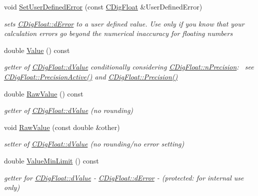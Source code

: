 \begin{DoxyCompactItemize}
void \hyperlink{classCDigFloat_a63f2632e5a762f37aa6eda4510c57502}{Set\+User\+Defined\+Error} (const \hyperlink{classCDigFloat}{C\+Dig\+Float} \&User\+Defined\+Error)
\begin{DoxyCompactList}\small\item\em sets \hyperlink{classCDigFloat_a25eb3782d1e727ff007a48f8308e3d4d}{C\+Dig\+Float\+::d\+Error} to a user defined value. Use only if you know that your calculation errors go beyond the numerical inaccuracy for floating numbers \end{DoxyCompactList}\item 
double \hyperlink{classCDigFloat_a51f185eb4ff3b24910c996739b6d5e9c}{Value} () const
\begin{DoxyCompactList}\small\item\em getter of \hyperlink{classCDigFloat_a4bbe69e30dd4e20527362493aa9aaf96}{C\+Dig\+Float\+::d\+Value} conditionally considering \hyperlink{classCDigFloat_ad580654be35246d14c91482581c0bc11}{C\+Dig\+Float\+::n\+Precision}\+:~\newline
 see \hyperlink{classCDigFloat_ad1f2365630c9e35e77c01093e73440c4}{C\+Dig\+Float\+::\+Precision\+Active()} and \hyperlink{classCDigFloat_ad66e2fc1bb19f491dfbc4fb7bfb20d47}{C\+Dig\+Float\+::\+Precision()} \end{DoxyCompactList}\item 
double \hyperlink{classCDigFloat_acb435346b1f7b2e78d8f8373a416533a}{Raw\+Value} () const
\begin{DoxyCompactList}\small\item\em getter of \hyperlink{classCDigFloat_a4bbe69e30dd4e20527362493aa9aaf96}{C\+Dig\+Float\+::d\+Value} (no rounding) \end{DoxyCompactList}\item 
void \hyperlink{classCDigFloat_a10dd39f19bfc21ae1d545d9203ef3e95}{Raw\+Value} (const double \&other)
\begin{DoxyCompactList}\small\item\em setter of \hyperlink{classCDigFloat_a4bbe69e30dd4e20527362493aa9aaf96}{C\+Dig\+Float\+::d\+Value} (no rounding/no error setting) \end{DoxyCompactList}\item 
double \hyperlink{classCDigFloat_a89603e1f9b9061b65376ac7b5fffddcf}{Value\+Min\+Limit} () const
\begin{DoxyCompactList}\small\item\em getter for \hyperlink{classCDigFloat_a4bbe69e30dd4e20527362493aa9aaf96}{C\+Dig\+Float\+::d\+Value} -\/ \hyperlink{classCDigFloat_a25eb3782d1e727ff007a48f8308e3d4d}{C\+Dig\+Float\+::d\+Error} -\/ (protected\+: for internal use only) \end{DoxyCompactList}\item 

\end{DoxyCompactItemize}
